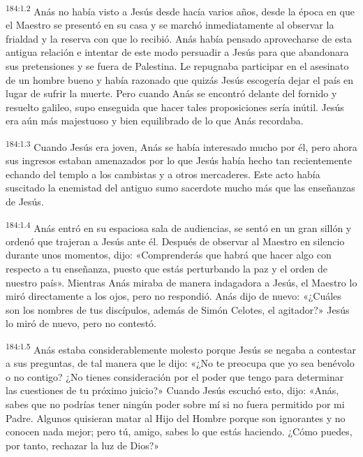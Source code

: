 \par
\textsuperscript{184:1.2} Anás no había visto a Jesús desde hacía varios años, desde la época en que el Maestro se presentó en su casa y se marchó inmediatamente al observar la frialdad y la reserva con que lo recibió. Anás había pensado aprovecharse de esta antigua relación e intentar de este modo persuadir a Jesús para que abandonara sus pretensiones y se fuera de Palestina. Le repugnaba participar en el asesinato de un hombre bueno y había razonado que quizás Jesús escogería dejar el país en lugar de sufrir la muerte. Pero cuando Anás se encontró delante del fornido y resuelto galileo, supo enseguida que hacer tales proposiciones sería inútil. Jesús era aún más majestuoso y bien equilibrado de lo que Anás recordaba.

\par
\textsuperscript{184:1.3} Cuando Jesús era joven, Anás se había interesado mucho por él, pero ahora sus ingresos estaban amenazados por lo que Jesús había hecho tan recientemente echando del templo a los cambistas y a otros mercaderes. Este acto había suscitado la enemistad del antiguo sumo sacerdote mucho más que las enseñanzas de Jesús.

\par
\textsuperscript{184:1.4} Anás entró en su espaciosa sala de audiencias, se sentó en un gran sillón y ordenó que trajeran a Jesús ante él. Después de observar al Maestro en silencio durante unos momentos, dijo: «Comprenderás que habrá que hacer algo con respecto a tu enseñanza, puesto que estás perturbando la paz y el orden de nuestro país». Mientras Anás miraba de manera indagadora a Jesús, el Maestro lo miró directamente a los ojos, pero no respondió. Anás dijo de nuevo: «¿Cuáles son los nombres de tus discípulos, además de Simón Celotes, el agitador?» Jesús lo miró de nuevo, pero no contestó.

\par
\textsuperscript{184:1.5} Anás estaba considerablemente molesto porque Jesús se negaba a contestar a sus preguntas, de tal manera que le dijo: «¿No te preocupa que yo sea benévolo o no contigo? ¿No tienes consideración por el poder que tengo para determinar las cuestiones de tu próximo juicio?» Cuando Jesús escuchó esto, dijo: «Anás, sabes que no podrías tener ningún poder sobre mí si no fuera permitido por mi Padre. Algunos quisieran matar al Hijo del Hombre porque son ignorantes y no conocen nada mejor; pero tú, amigo, sabes lo que estás haciendo. ¿Cómo puedes, por tanto, rechazar la luz de Dios?»

